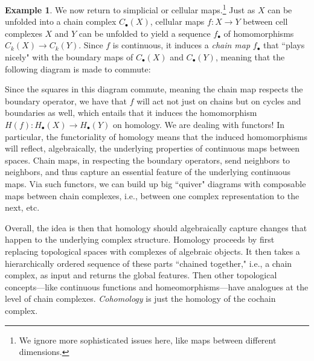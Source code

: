\documentclass[11pt]{book}
\theoremstyle{definition}
\newtheorem{example}{Example}[section]
\theoremstyle{definition}
\theoremstyle{definition}
\theoremstyle{theorem}
\theoremstyle{definition}
\begin{document}
\begin{example}
	We now return to simplicial or cellular maps.\footnote{We ignore more sophisticated issues here, like maps between different dimensions.} Just as $X$ can be unfolded into a chain complex $C_{\bullet}(X)$, cellular maps $f: X \rightarrow Y$ between cell complexes $X$ and $Y$ can be unfolded to yield a sequence $f_{\bullet}$ of homomorphisms $C_k(X) \rightarrow C_k(Y)$. Since $f$ is continuous, it induces a \textit{chain map} $f_{\bullet}$ that ``plays nicely" with the boundary maps of $C_{\bullet}(X)$ and $C_{\bullet}(Y)$, meaning that the following diagram is made to commute:
	\begin{center}  
	\end{center} 
	Since the squares in this diagram commute, meaning the chain map respects the boundary operator, we have that $f$ will act not just on chains but on cycles and boundaries as well, which entails that it induces the homomorphism $H(f): H_{\bullet}(X) \rightarrow H_{\bullet}(Y)$ on homology. We are dealing with functors! In particular, the functoriality of homology means that the induced homomorphisms will reflect, algebraically, the underlying properties of continuous maps between spaces. Chain maps, in respecting the boundary operators, send neighbors to neighbors, and thus capture an essential feature of the underlying continuous maps. Via such functors, we can build up big ``quiver" diagrams with composable maps between chain complexes, i.e., between one complex representation to the next, etc. \par 
	 	Overall, the idea is then that homology should algebraically capture changes that happen to the underlying complex structure. Homology proceeds by first replacing topological spaces with complexes of algebraic objects. It then takes a hierarchically ordered sequence of these parts ``chained together," i.e., a chain complex, as input and returns the global features. Then other topological concepts---like continuous functions and homeomorphisms---have analogues at the level of chain complexes. \textit{Cohomology} is just the homology of the cochain complex.\par 

\end{example}
\end{document}
